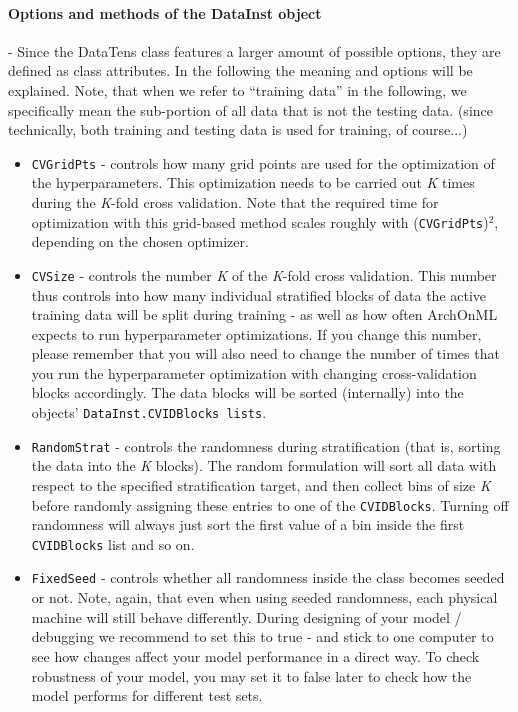 \documentclass[12pt]{achemso}
\begin{document}
\paragraph{Options and methods of the DataInst object} -  Since the DataTens class features a larger amount of possible options, they are defined as class attributes. In the following the meaning and options will be explained. Note, that when we refer to ``training data'' in the following, we specifically mean the sub-portion of all data that is not the testing data. (since technically, both training and testing data is used for training, of course...)

\begin{itemize}
    \item \texttt{CVGridPts} - controls how many grid points are used for the optimization of the hyperparameters. This optimization needs to be carried out \textit{K} times during the \textit{K}-fold cross validation. Note that the required time for optimization with this grid-based method scales roughly with (\texttt{CVGridPts})$^2$, depending on the chosen optimizer.

    \item \texttt{CVSize} - controls the number \textit{K} of the \textit{K}-fold cross validation. This number thus controls into how many individual stratified blocks of data the active training data will be split during training - as well as how often ArchOnML expects to run hyperparameter optimizations. If you change this number, please remember that you will also need to change the number of times that you run the hyperparameter optimization with changing cross-validation blocks accordingly. The data blocks will be sorted (internally) into the objects' \texttt{DataInst.CVIDBlocks lists}.

    \item \texttt{RandomStrat} - controls the randomness during stratification (that is, sorting the data into the \textit{K} blocks). The random formulation will sort all data with respect to the specified stratification target, and then collect bins of size \textit{K} before randomly assigning these entries to one of the \texttt{CVIDBlocks}. Turning off randomness will always just sort the first value of a bin inside the first \texttt{CVIDBlocks} list and so on.

    \item \texttt{FixedSeed} - controls whether all randomness inside the class becomes seeded or not. Note, again, that even when using seeded randomness, each physical machine will still behave differently. During designing of your model / debugging we recommend to set this to true - and stick to one computer to see how changes affect your model performance in a direct way. To check robustness of your model, you may set it to false later to check how the model performs for different test sets.


\end{itemize}
\end{document}
